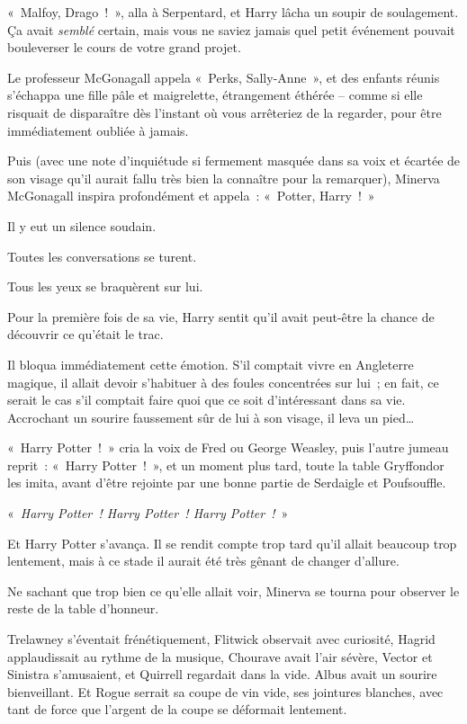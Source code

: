 «~Malfoy, Drago~!~», alla à Serpentard, et Harry lâcha un soupir de soulagement. Ça avait \emph{semblé} certain, mais vous ne saviez jamais quel petit événement pouvait bouleverser le cours de votre grand projet.

Le professeur McGonagall appela «~Perks, Sally-Anne~», et des enfants réunis s'échappa une fille pâle et maigrelette, étrangement éthérée -- comme si elle risquait de disparaître dès l'instant où vous arrêteriez de la regarder, pour être immédiatement oubliée à jamais.

Puis (avec une note d'inquiétude si fermement masquée dans sa voix et écartée de son visage qu'il aurait fallu très bien la connaître pour la remarquer), Minerva McGonagall inspira profondément et appela~: «~Potter, Harry~!~»

Il y eut un silence soudain.

Toutes les conversations se turent.

Tous les yeux se braquèrent sur lui.

Pour la première fois de sa vie, Harry sentit qu'il avait peut-être la chance de découvrir ce qu'était le trac.

Il bloqua immédiatement cette émotion. S'il comptait vivre en Angleterre magique, il allait devoir s'habituer à des foules concentrées sur lui~; en fait, ce serait le cas s'il comptait faire quoi que ce soit d'intéressant dans sa vie. Accrochant un sourire faussement sûr de lui à son visage, il leva un pied…

«~Harry Potter~!~» cria la voix de Fred ou George Weasley, puis l'autre jumeau reprit~: «~Harry Potter~!~», et un moment plus tard, toute la table Gryffondor les imita, avant d'être rejointe par une bonne partie de Serdaigle et Poufsouffle.

«~\emph{Harry Potter~! Harry Potter~! Harry Potter~!}~»

Et Harry Potter s'avança. Il se rendit compte trop tard qu'il allait beaucoup trop lentement, mais à ce stade il aurait été très gênant de changer d'allure.

\later

Ne sachant que trop bien ce qu'elle allait voir, Minerva se tourna pour observer le reste de la table d'honneur.

Trelawney s'éventait frénétiquement, Flitwick observait avec curiosité, Hagrid applaudissait au rythme de la musique, Chourave avait l'air sévère, Vector et Sinistra s'amusaient, et Quirrell regardait dans la vide. Albus avait un sourire bienveillant. Et Rogue serrait sa coupe de vin vide, ses jointures blanches, avec tant de force que l'argent de la coupe se déformait lentement.

